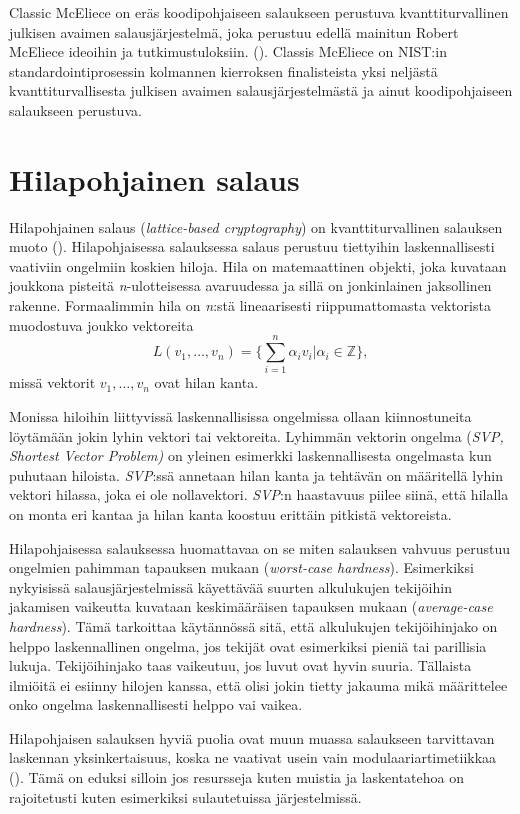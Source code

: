 Classic McEliece on eräs koodipohjaiseen salaukseen perustuva kvanttiturvallinen julkisen avaimen salausjärjestelmä, joka perustuu edellä mainitun Robert McEliece ideoihin ja tutkimustuloksiin. (\cite{alagic2020status}). Classis McEliece on NIST:in standardointiprosessin kolmannen kierroksen finalisteista yksi neljästä kvanttiturvallisesta julkisen avaimen salausjärjestelmästä ja ainut koodipohjaiseen salaukseen perustuva.

\section{Hilapohjainen salaus}
Hilapohjainen salaus (\emph{lattice-based cryptography}) on kvanttiturvallinen salauksen muoto (\cite{regev2006lattice}). Hilapohjaisessa salauksessa salaus perustuu tiettyihin laskennallisesti vaativiin ongelmiin koskien hiloja. Hila on matemaattinen objekti, joka kuvataan joukkona pisteitä \emph{n}-ulotteisessa avaruudessa ja sillä on jonkinlainen jaksollinen rakenne. Formaalimmin hila on \emph{n}:stä lineaarisesti riippumattomasta vektorista muodostuva joukko vektoreita 
\[L(v_1, \ldots ,v_n) =\Bigg\{ {\sum_{i=1}^{n}\alpha_i 
v_i|\alpha_i \in \mathbb{Z}} \Bigg\},\]
missä vektorit $v_1, \ldots ,v_n$ ovat hilan kanta.

Monissa hiloihin liittyvissä 
laskennallisissa ongelmissa ollaan kiinnostuneita löytämään jokin lyhin vektori tai vektoreita. Lyhimmän vektorin ongelma (\emph{SVP, Shortest Vector Problem)} on yleinen esimerkki laskennallisesta ongelmasta kun puhutaan hiloista. \emph{SVP}:ssä annetaan hilan kanta ja tehtävän on määritellä lyhin vektori hilassa, joka ei ole nollavektori. \emph{SVP}:n haastavuus piilee siinä, että hilalla on monta eri kantaa ja hilan kanta koostuu erittäin pitkistä vektoreista.

Hilapohjaisessa salauksessa huomattavaa on se miten salauksen vahvuus perustuu ongelmien pahimman tapauksen mukaan (\emph{worst-case hardness}). Esimerkiksi nykyisissä salausjärjestelmissä käyettävää suurten alkulukujen tekijöihin jakamisen vaikeutta kuvataan keskimääräisen tapauksen mukaan (\emph{average-case hardness}). Tämä tarkoittaa käytännössä sitä, että alkulukujen tekijöihinjako on helppo laskennallinen ongelma, jos tekijät ovat esimerkiksi pieniä tai parillisia lukuja. Tekijöihinjako taas vaikeutuu, jos luvut ovat hyvin suuria. Tällaista ilmiöitä ei esiinny hilojen kanssa, että olisi jokin tietty jakauma mikä määrittelee onko ongelma laskennallisesti helppo vai vaikea.

Hilapohjaisen salauksen hyviä puolia ovat muun muassa salaukseen tarvittavan laskennan yksinkertaisuus, koska ne vaativat usein vain modulaariartimetiikkaa (\cite{regev2006lattice}). Tämä on eduksi silloin jos resursseja kuten muistia ja laskentatehoa on rajoitetusti kuten esimerkiksi sulautetuissa järjestelmissä.

